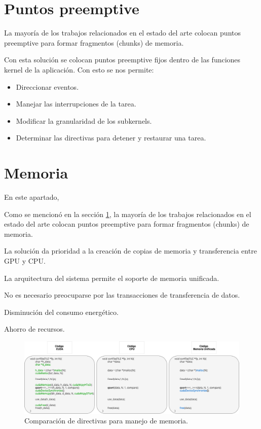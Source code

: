   \section{Puntos preemptive}\label{puntosPreemptive}

La mayoría de los trabajos relacionados en el estado del arte colocan puntos preemptive para formar fragmentos (chunks) de memoria.

Con esta solución se colocan puntos preemptive fijos dentro de las funciones kernel de la aplicación. Con esto se nos permite:

\begin{itemize}
\item Direccionar eventos.
\item Manejar las interrupciones de la tarea.
\item Modificar la granularidad de los subkernels.
\item Determinar las directivas para detener y restaurar una tarea.
\end{itemize}     
  
  \section{Memoria}
  
  En este apartado, 
  
  Como se mencionó en la sección \ref{puntosPreemptive}, la mayoría de los trabajos relacionados en el estado del arte colocan puntos preemptive para formar fragmentos (chunks) de memoria.
  
  La solución da prioridad a la creación de copias de memoria y transferencia entre GPU y CPU.
  
  La arquitectura del sistema permite el soporte de memoria unificada.
  
  No es necesario preocuparse por las transacciones de transferencia de datos.
  
  Disminución del consumo energético.
  
  Ahorro de recursos.
  
  \begin{figure}[ht]
      \centering
        \includegraphics[scale=.50]{img/direcMem}
        \caption{Comparación de directivas para manejo de memoria.}
        \label{fig:direcMem}
    \end{figure}
  
